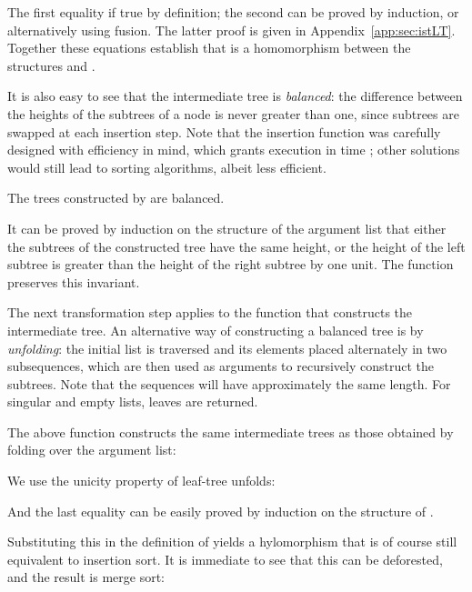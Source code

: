 \documentclass[a4paper,11pt]{llncs}
\begin{document}
The first equality if true by definition; the second can be proved by
induction, or alternatively using fusion. The latter proof is given in
Appendix~\ref{app:sec:istLT}. Together these equations establish that
 is a homomorphism between the structures  and .
\endproof

It is also easy to see that the intermediate tree is \emph{balanced}:
the difference between the heights of the subtrees of a node is never
greater than one, since subtrees are swapped at each insertion
step. Note that the insertion function  was carefully
designed with efficiency in mind, which grants execution in time ; other solutions would still lead to sorting algorithms,
albeit less efficient.


\begin{proposition}
  The trees constructed by  are balanced.
\end{proposition}

\proof 
It can be proved by induction on the structure of the argument list
that either the subtrees of the constructed tree have the same height,
or the height of the left subtree is greater than the height of the
right subtree by one unit. The function  preserves this
invariant.
\endproof

The next transformation step applies to the function that constructs
the intermediate tree.  An alternative way of constructing a balanced
tree is by \emph{unfolding}: the initial list is traversed and its
elements placed alternately in two subsequences, which are then used
as arguments to recursively construct the subtrees. Note that the
sequences will have approximately the same length. For singular and
empty lists, leaves are returned.


\begin{proposition} The above function constructs the same
  intermediate trees as those obtained by folding over the argument
  list:
  
\end{proposition}

\proof

We use the unicity property of leaf-tree unfolds:


And the last equality can be easily proved by induction on the
structure of .
\endproof

Substituting this in the definition of  yields a
hylomorphism that is of course still equivalent to insertion sort. It
is immediate to see that this can be deforested, and the result is
merge sort:
\end{document}
